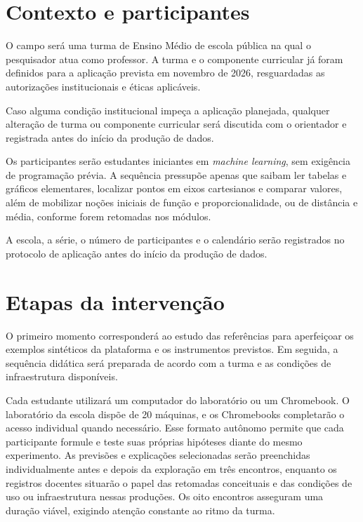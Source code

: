 \section{Contexto e participantes}

O campo será uma turma de Ensino Médio de escola pública na qual o pesquisador atua como professor. A turma e o componente curricular já foram definidos para a aplicação prevista em novembro de 2026, resguardadas as autorizações institucionais e éticas aplicáveis.

Caso alguma condição institucional impeça a aplicação planejada, qualquer alteração de turma ou componente curricular será discutida com o orientador e registrada antes do início da produção de dados.

Os participantes serão estudantes iniciantes em \textit{machine learning}, sem exigência de programação prévia. A sequência pressupõe apenas que saibam ler tabelas e gráficos elementares, localizar pontos em eixos cartesianos e comparar valores, além de mobilizar noções iniciais de função e proporcionalidade, ou de distância e média, conforme forem retomadas nos módulos.

A escola, a série, o número de participantes e o calendário serão registrados no protocolo de aplicação antes do início da produção de dados.

\section{Etapas da intervenção}

O primeiro momento corresponderá ao estudo das referências para aperfeiçoar os exemplos sintéticos da plataforma e os instrumentos previstos. Em seguida, a sequência didática será preparada de acordo com a turma e as condições de infraestrutura disponíveis.

Cada estudante utilizará um computador do laboratório ou um Chromebook. O laboratório da escola dispõe de 20 máquinas, e os Chromebooks completarão o acesso individual quando necessário. Esse formato autônomo permite que cada participante formule e teste suas próprias hipóteses diante do mesmo experimento. As previsões e explicações selecionadas serão preenchidas individualmente antes e depois da exploração em três encontros, enquanto os registros docentes situarão o papel das retomadas conceituais e das condições de uso ou infraestrutura nessas produções. Os oito encontros asseguram uma duração viável, exigindo atenção constante ao ritmo da turma.

